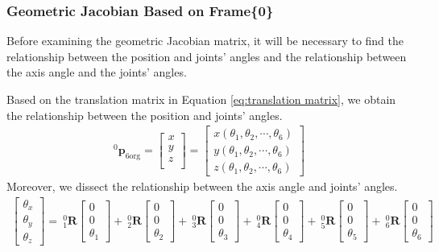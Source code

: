\subsubsection{Geometric Jacobian Based on Frame\{0\}}
Before examining the geometric Jacobian matrix, it will be necessary to find the relationship between the position and joints' angles and the relationship between the axis angle and the joints' angles.
\par\noindent
Based on the translation matrix in Equation \ref{eq:translation matrix}, we obtain the relationship between the position and joints' angles.
\begin{equation}
\label{eq:lin vel}
\begin{split}
^0\boldsymbol{p}_\mathrm{6org}
= 
\begin{bmatrix}
x\\
y\\
z\\
\end{bmatrix} 
=
\begin{bmatrix}
x(\theta _1, \theta _2, \cdots, \theta _6)\\
y(\theta _1, \theta _2, \cdots, \theta _6)\\
z(\theta _1, \theta _2, \cdots, \theta _6)
\end{bmatrix} 
\end{split}
\end{equation}
Moreover, we dissect the relationship between the axis angle and joints' angles.
\begin{equation}
\label{eq:ang vel_axis}
\begin{split}
\begin{bmatrix}
\theta _x \\
\theta _y \\
\theta _z 
\end{bmatrix}
=
\ ^0_1\mathbf{R}
\begin{bmatrix}
0 \\ 
0 \\ 
\theta _1
\end{bmatrix}
+
\ ^0_2\mathbf{R}
\begin{bmatrix}
0 \\ 
0 \\ 
\theta _2
\end{bmatrix}
+
\ ^0_3\mathbf{R}
\begin{bmatrix}
0 \\ 
0 \\ 
\theta _3
\end{bmatrix}
+
\ ^0_4\mathbf{R}
\begin{bmatrix}
0 \\ 
0 \\ 
\theta _4
\end{bmatrix}
+
\ ^0_5\mathbf{R}
\begin{bmatrix}
0 \\ 
0 \\ 
\theta _5
\end{bmatrix}
+
\ ^0_6\mathbf{R}
\begin{bmatrix}
0 \\ 
0 \\ 
\theta _6
\end{bmatrix}
\end{split}
\end{equation}
